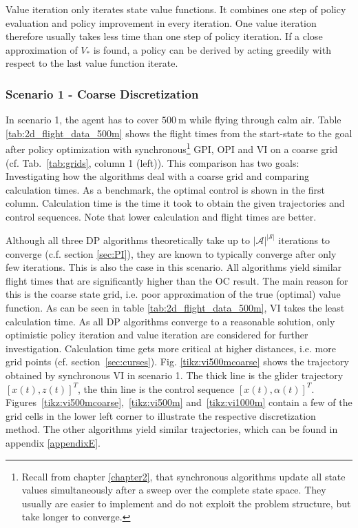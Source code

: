 Value iteration only iterates state value functions. It combines one step of policy evaluation and policy improvement in every iteration. One value iteration therefore usually takes less time than one step of policy iteration. If a close approximation of $V_*$ is found, a policy can be derived by acting greedily with respect to the last value function iterate.

\subsubsection{Scenario 1 - Coarse Discretization}

In scenario 1, the agent has to cover $500~\text{m}$ while flying through calm air. Table \ref{tab:2d_flight_data_500m} shows the flight times from the start-state to the goal after policy optimization with synchronous\footnote{Recall from chapter \ref{chapter2}, that synchronous algorithms update all state values simultaneously after a sweep over the complete state space. They usually are easier to implement and do not exploit the problem structure, but take longer to converge.} GPI, OPI and VI on a coarse grid (cf. Tab.~\ref{tab:grids}, column 1 (left)). This comparison has two goals: Investigating how the algorithms deal with a coarse grid and comparing calculation times. As a benchmark, the optimal control  is shown in the first column. Calculation time is the time it took to obtain the given trajectories and control sequences. Note that lower calculation and flight times are better.

Although all three DP algorithms theoretically take up to $|\mathcal{A}|^{|\mathcal{S}|}$ iterations to converge (c.f. section \ref{sec:PI}), they are known to typically converge after only few iterations. This is also the case in this scenario. All algorithms yield similar flight times that are significantly higher than the OC result. The main reason for this is the coarse state grid, i.e. poor approximation of the true (optimal) value function. As can be seen in table \ref{tab:2d_flight_data_500m}, VI takes the least calculation time. As all DP algorithms converge to a reasonable solution, only optimistic policy iteration and value iteration are considered for further investigation. Calculation time gets more critical at higher distances, i.e. more grid points (cf. section~\ref{sec:curses}). Fig. \ref{tikz:vi500mcoarse} shows the trajectory obtained by synchronous VI in scenario 1. The thick line is the glider trajectory $[x(t),z(t)]^T$, the thin line is the control sequence $[x(t),\alpha(t)]^T$. Figures~\ref{tikz:vi500mcoarse},~\ref{tikz:vi500m} and~\ref{tikz:vi1000m} contain a few of the grid cells in the lower left corner to illustrate the respective discretization method. The other algorithms yield similar trajectories, which can be found in appendix \ref{appendixE}.

